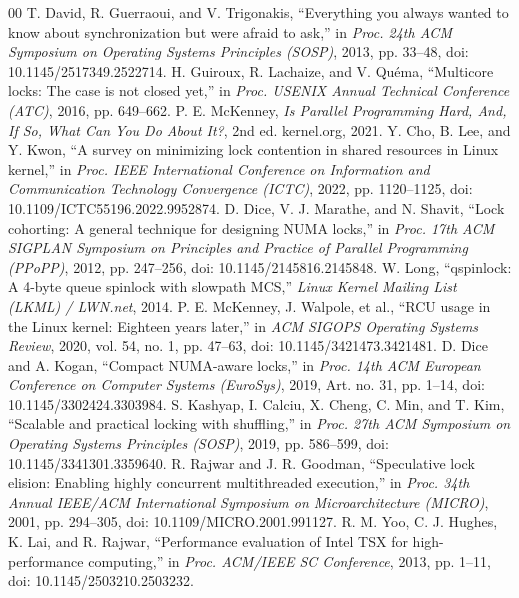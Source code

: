 \documentclass[conference]{IEEEtran}
\begin{document}
\begin{thebibliography}{00}
 T. David, R. Guerraoui, and V. Trigonakis, ``Everything you always wanted to know about synchronization but were afraid to ask,'' in \textit{Proc. 24th ACM Symposium on Operating Systems Principles (SOSP)}, 2013, pp. 33--48, doi: 10.1145/2517349.2522714.
 H. Guiroux, R. Lachaize, and V. Qu\'{e}ma, ``Multicore locks: The case is not closed yet,'' in \textit{Proc. USENIX Annual Technical Conference (ATC)}, 2016, pp. 649--662.
 P. E. McKenney, \textit{Is Parallel Programming Hard, And, If So, What Can You Do About It?}, 2nd ed. kernel.org, 2021.
 Y. Cho, B. Lee, and Y. Kwon, ``A survey on minimizing lock contention in shared resources in Linux kernel,'' in \textit{Proc. IEEE International Conference on Information and Communication Technology Convergence (ICTC)}, 2022, pp. 1120--1125, doi: 10.1109/ICTC55196.2022.9952874.
 D. Dice, V. J. Marathe, and N. Shavit, ``Lock cohorting: A general technique for designing NUMA locks,'' in \textit{Proc. 17th ACM SIGPLAN Symposium on Principles and Practice of Parallel Programming (PPoPP)}, 2012, pp. 247--256, doi: 10.1145/2145816.2145848.
 W. Long, ``qspinlock: A 4-byte queue spinlock with slowpath MCS,'' \textit{Linux Kernel Mailing List (LKML) / LWN.net}, 2014.
 P. E. McKenney, J. Walpole, et al., ``RCU usage in the Linux kernel: Eighteen years later,'' in \textit{ACM SIGOPS Operating Systems Review}, 2020, vol. 54, no. 1, pp. 47--63, doi: 10.1145/3421473.3421481.
 D. Dice and A. Kogan, ``Compact NUMA-aware locks,'' in \textit{Proc. 14th ACM European Conference on Computer Systems (EuroSys)}, 2019, Art. no. 31, pp. 1--14, doi: 10.1145/3302424.3303984.
 S. Kashyap, I. Calciu, X. Cheng, C. Min, and T. Kim, ``Scalable and practical locking with shuffling,'' in \textit{Proc. 27th ACM Symposium on Operating Systems Principles (SOSP)}, 2019, pp. 586--599, doi: 10.1145/3341301.3359640.
 R. Rajwar and J. R. Goodman, ``Speculative lock elision: Enabling highly concurrent multithreaded execution,'' in \textit{Proc. 34th Annual IEEE/ACM International Symposium on Microarchitecture (MICRO)}, 2001, pp. 294--305, doi: 10.1109/MICRO.2001.991127.
 R. M. Yoo, C. J. Hughes, K. Lai, and R. Rajwar, ``Performance evaluation of Intel TSX for high-performance computing,'' in \textit{Proc. ACM/IEEE SC Conference}, 2013, pp. 1--11, doi: 10.1145/2503210.2503232.

\end{thebibliography}
\end{document}

